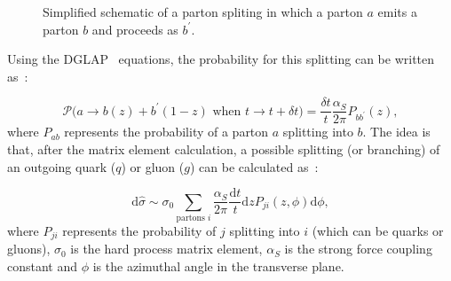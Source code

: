 \begin{figure}[H]
\centering
{}
\caption{Simplified schematic of a parton spliting in which a parton $a$ emits a parton $b$ and proceeds as $b^\prime$.}
\label{fig:pshower_collinear}
\end{figure}

Using the DGLAP~\cite{altarelli_parisi} equations, the probability for this splitting can be written as~\cite{dissertori}:

\begin{equation}
\displaystyle
\mathcal{P}\Big( a \rightarrow b(z) + b^\prime(1-z) \textrm{ when } t \rightarrow t + \delta t \Big) = \frac{\delta t}{t} \frac{\alpha_S}{2\pi} P_{b b^\prime}(z),
\label{eq:prob_dglap}
\end{equation}
where $P_{ab}$ represents the probability of a parton $a$ splitting into $b$.
The idea is that, after the matrix element calculation, a possible splitting (or branching) of an outgoing quark ($q$) or gluon ($g$) can be calculated as~\cite{lhc_event_gen,dissertori}:

\begin{equation}
\displaystyle
\textrm{d}\hat{\sigma} \sim \sigma_0 \sum_{\textrm{partons } i} \frac{\alpha_S}{2\pi} \frac{\textrm{d}t}{t} \textrm{d}z P_{ji}(z, \phi) \textrm{d}\phi, 
\label{eq:parton_shower}
\end{equation}
where $P_{ji}$ represents the probability of $j$ splitting into $i$ (which can be quarks or gluons), $\sigma_0$ is the hard process matrix element, $\alpha_S$
is the strong force coupling constant and $\phi$ is
the azimuthal angle in the transverse plane.

